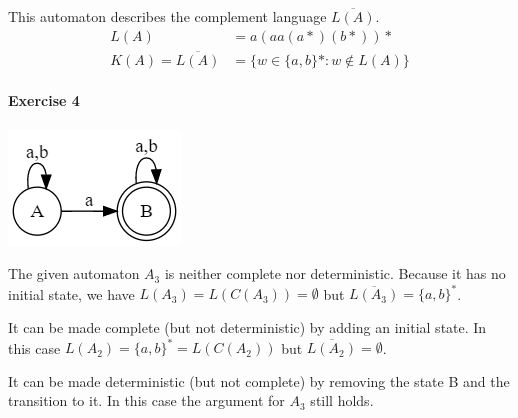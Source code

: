 \documentclass{article}
\begin{document}
This automaton describes the complement language $\overline{L(A)}$.
\begin{align*}
    L(A) &= a(aa(a*)(b*))* \\
    K(A) = \overline{L(A)} &= \{ w \in \{a,b\}* : w \not\in L(A) \}
\end{align*}

\paragraph{Exercise 4}

\begin{center}
    \includegraphics[width=.2\textwidth]{4_example.png}
\end{center}

The given automaton $A_3$ is neither complete nor deterministic. Because it has no initial state, we have $L(A_3) = L(C(A_3)) = \emptyset$ but $\overline{L(A_3)} = \{a,b\}^*$.

It can be made complete (but not deterministic) by adding an initial state. In this case $L(A_2) = \{a,b\}^* = L(C(A_2))$ but $\overline{L(A_2)} = \emptyset$. 

It can be made deterministic (but not complete) by removing the state B and the transition to it. In this case the argument for $A_3$ still holds.
\end{document}
